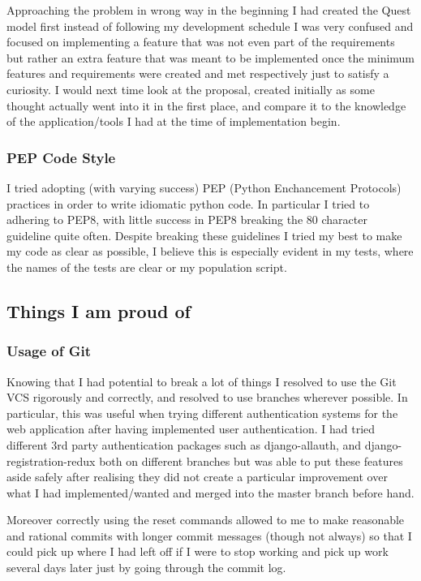 \documentclass[11pt,a4paper]{article}
\begin{document}
Approaching the problem in wrong way in the beginning I had created the Quest model first instead of following my development schedule I was very confused and focused on implementing a feature that was not even part of the requirements but rather an extra feature that was meant to be implemented once the minimum features and requirements were created and met respectively just to satisfy a curiosity. I would next time look at the proposal, created initially as some thought actually went into it in the first place, and compare it to the knowledge of the application/tools I had at the time of implementation begin.

\subsubsection{PEP Code Style}
I tried adopting (with varying success) PEP (Python Enchancement Protocols) practices in order to write idiomatic python code. In particular I tried to adhering to PEP8, with little success in PEP8 breaking the 80 character guideline quite often. Despite breaking these guidelines I tried my best to make my code as clear as possible, I believe this is especially evident in my tests, where the names of the tests are clear or my population script.

\subsection{Things I am proud of}
\subsubsection{Usage of Git}
Knowing that I had potential to break a lot of things I resolved to use the Git VCS rigorously and correctly, and resolved to use branches wherever possible. In particular, this was useful when trying different authentication systems for the web application after having implemented user authentication. I had tried different 3rd party authentication packages such as django-allauth, and django-registration-redux both on different branches but was able to put these features aside safely after realising they did not create a particular improvement over what I had implemented/wanted and merged into the master branch before hand.

Moreover correctly using the reset commands allowed to me to make reasonable and rational commits with longer commit messages (though not always) so that I could pick up where I had left off if I were to stop working and pick up work several days later just by going through the commit log.
\end{document}
